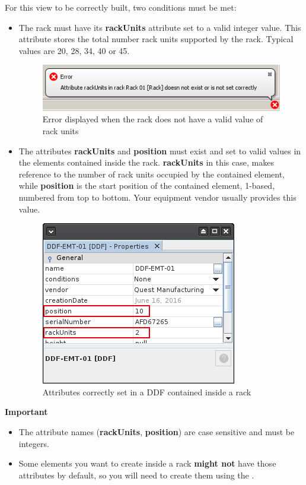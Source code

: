 \documentclass[a4paper]{article}
\begin{document}
		For this view to be correctly built, two conditions must be met:
		\begin{itemize}
			\item The rack must have its \textbf{rackUnits} attribute set to a valid integer value. This attribute stores the total number rack units supported by the rack. Typical values are 20, 28, 34, 40 or 45.
			\begin{figure}[h!]
				\centering
				\includegraphics[width=0.6\linewidth]{img/error_rack_view_not_rackunits.png}
				\caption{Error displayed when the rack does not have a valid value of rack units}
				\label{fig:error_rack_view_not_rackunits}
			\end{figure}
			\item The attributes \textbf{rackUnits} and \textbf{position} must exist and set to valid values in the elements contained inside the rack. \textbf{rackUnits} in this case, makes reference to the number of rack units occupied by the contained element, while \textbf{position} is the start position of the contained element, 1-based, numbered from top to bottom. Your equipment vendor usually provides this value.
			\begin{figure}[h!]
				\centering
				\includegraphics[width=0.4\linewidth]{img/rack_view_attributes_contained_element.png}
				\caption{Attributes correctly set in a DDF contained inside a rack}
				\label{fig:rack_view_attributes_contained_element}
			\end{figure}
		\end{itemize}
		\begin{framed} {\large \textbf{Important}}
			\begin{itemize}
				\item The attribute names (\textbf{rackUnits}, \textbf{position}) are case sensitive and must be integers.
				\item Some elements you want to create inside a rack \textbf{might not} have those attributes by default, so you will need to create them using the .			
			\end{itemize}
		\end{framed}
\end{document}

